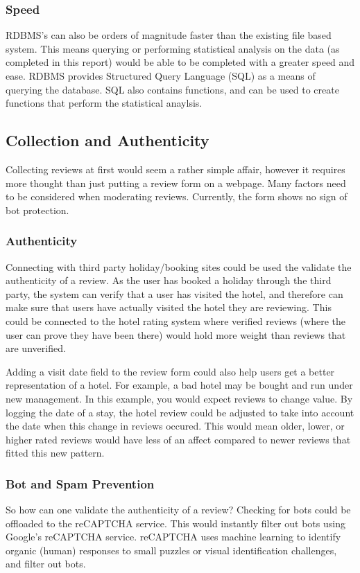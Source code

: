 \documentclass[a4paper]{article}
\begin{document}
\subsubsection{Speed}
RDBMS's can also be orders of magnitude faster than the existing file based system.
This means querying or performing statistical analysis on the data (as completed in this report) would be able to be completed with a greater speed and ease.
RDBMS provides Structured Query Language (SQL) as a means of querying the database.
SQL also contains functions, and can be used to create functions that perform the statistical anaylsis.


\subsection{Collection and Authenticity}
Collecting reviews at first would seem a rather simple affair, however it requires more thought than just putting a review form on a webpage.
Many factors need to be considered when moderating reviews.
Currently, the form shows no sign of bot protection.

\subsubsection{Authenticity}
Connecting with third party holiday/booking sites could be used the validate the authenticity of a review.
As the user has booked a holiday through the third party, the system can verify that a user has visited the hotel, and therefore can make sure that users have actually visited the hotel they are reviewing.
This could be connected to the hotel rating system where verified reviews (where the user can prove they have been there) would hold more weight than reviews that are unverified.

Adding a visit date field to the review form could also help users get a better representation of a hotel.
For example, a bad hotel may be bought and run under new management.
In this example, you would expect reviews to change value.
By logging the date of a stay, the hotel review could be adjusted to take into account the date when this change in reviews occured.
This would mean older, lower, or higher rated reviews would have less of an affect compared to newer reviews that fitted this new pattern.

\subsubsection{Bot and Spam Prevention}
So how can one validate the authenticity of a review?
Checking for bots could be offloaded to the reCAPTCHA service.
This would instantly filter out bots using Google's reCAPTCHA service.
reCAPTCHA uses machine learning to identify organic (human) responses to small puzzles or visual identification challenges, and filter out bots.
\end{document}
